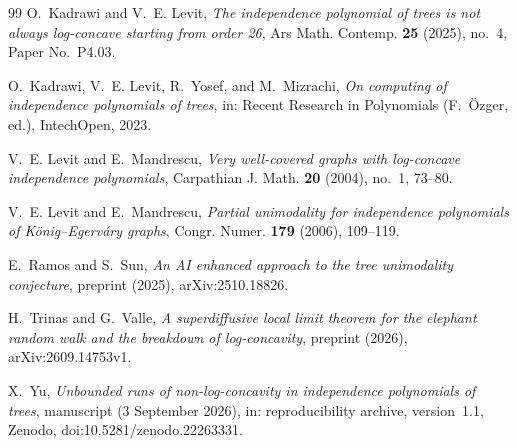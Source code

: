 \documentclass{amsart}
\theoremstyle{definition}
\theoremstyle{remark}
\numberwithin{equation}{section}
\begin{document}
\begin{thebibliography}{99}
O.~Kadrawi and V.~E. Levit, \emph{The independence polynomial of trees is not always log-concave starting from order 26}, Ars Math. Contemp. \textbf{25} (2025), no.~4, Paper No.~P4.03.

O.~Kadrawi, V.~E. Levit, R.~Yosef, and M.~Mizrachi, \emph{On computing of independence polynomials of trees}, in: Recent Research in Polynomials (F.~\"Ozger, ed.), IntechOpen, 2023.

V.~E. Levit and E.~Mandrescu, \emph{Very well-covered graphs with log-concave independence polynomials}, Carpathian J. Math. \textbf{20} (2004), no.~1, 73--80.

V.~E. Levit and E.~Mandrescu, \emph{Partial unimodality for independence polynomials of K\"onig--Egerv\'ary graphs}, Congr. Numer. \textbf{179} (2006), 109--119.

E.~Ramos and S.~Sun, \emph{An AI enhanced approach to the tree unimodality conjecture}, preprint (2025), arXiv:2510.18826.

H.~Trinas and G.~Valle, \emph{A superdiffusive local limit theorem for the elephant random walk and the breakdown of log-concavity}, preprint (2026), arXiv:2609.14753v1.

X.~Yu, \emph{Unbounded runs of non-log-concavity in independence polynomials of trees}, manuscript (3 September 2026), in: reproducibility archive, version~1.1, Zenodo, doi:10.5281/zenodo.22263331.

\end{thebibliography}
\end{document}
